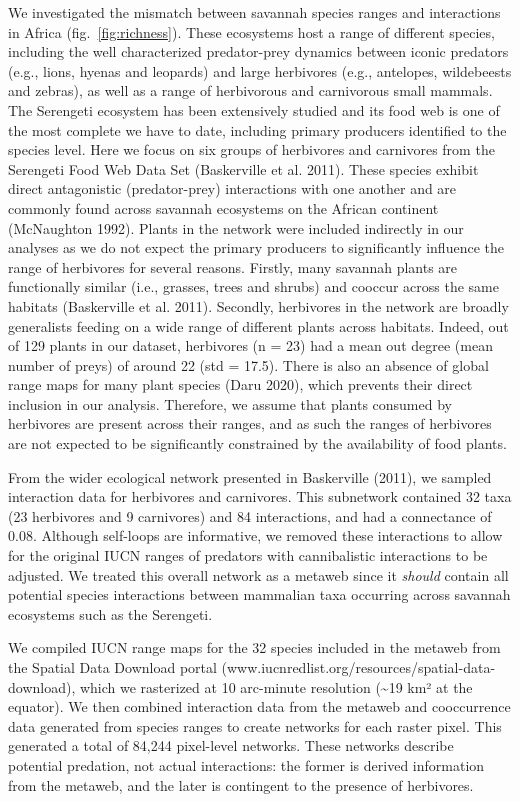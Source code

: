 \documentclass[11pt]{article}
\begin{document}
We investigated the mismatch between savannah species ranges and
interactions in Africa (fig.~\ref{fig:richness}). These ecosystems host
a range of different species, including the well characterized
predator-prey dynamics between iconic predators (e.g., lions, hyenas and
leopards) and large herbivores (e.g., antelopes, wildebeests and
zebras), as well as a range of herbivorous and carnivorous small
mammals. The Serengeti ecosystem has been extensively studied and its
food web is one of the most complete we have to date, including primary
producers identified to the species level. Here we focus on six groups
of herbivores and carnivores from the Serengeti Food Web Data Set
(Baskerville et al. 2011). These species exhibit direct antagonistic
(predator-prey) interactions with one another and are commonly found
across savannah ecosystems on the African continent (McNaughton 1992).
Plants in the network were included indirectly in our analyses as we do
not expect the primary producers to significantly influence the range of
herbivores for several reasons. Firstly, many savannah plants are
functionally similar (i.e., grasses, trees and shrubs) and cooccur
across the same habitats (Baskerville et al. 2011). Secondly, herbivores
in the network are broadly generalists feeding on a wide range of
different plants across habitats. Indeed, out of 129 plants in our
dataset, herbivores (n = 23) had a mean out degree (mean number of
preys) of around 22 (std = 17.5). There is also an absence of global
range maps for many plant species (Daru 2020), which prevents their
direct inclusion in our analysis. Therefore, we assume that plants
consumed by herbivores are present across their ranges, and as such the
ranges of herbivores are not expected to be significantly constrained by
the availability of food plants.

From the wider ecological network presented in Baskerville (2011), we
sampled interaction data for herbivores and carnivores. This subnetwork
contained 32 taxa (23 herbivores and 9 carnivores) and 84 interactions,
and had a connectance of 0.08. Although self-loops are informative, we
removed these interactions to allow for the original IUCN ranges of
predators with cannibalistic interactions to be adjusted. We treated
this overall network as a metaweb since it \emph{should} contain all
potential species interactions between mammalian taxa occurring across
savannah ecosystems such as the Serengeti.

We compiled IUCN range maps for the 32 species included in the metaweb
from the Spatial Data Download portal
(www.iucnredlist.org/resources/spatial-data-download), which we
rasterized at 10 arc-minute resolution (\textasciitilde19 km² at the
equator). We then combined interaction data from the metaweb and
cooccurrence data generated from species ranges to create networks for
each raster pixel. This generated a total of 84,244 pixel-level
networks. These networks describe potential predation, not actual
interactions: the former is derived information from the metaweb, and
the later is contingent to the presence of herbivores.
\end{document}
